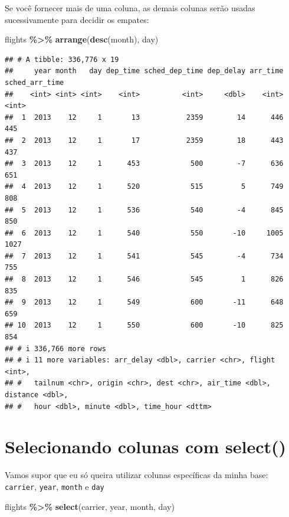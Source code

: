 \documentclass[
]{book}
\newenvironment{Shaded}{\begin{snugshade}}{\end{snugshade}}
\newcommand{\FunctionTok}[1]{\textcolor[rgb]{0.13,0.29,0.53}{\textbf{#1}}}
\newcommand{\NormalTok}[1]{#1}
\newcommand{\SpecialCharTok}[1]{\textcolor[rgb]{0.81,0.36,0.00}{\textbf{#1}}}
\begin{document}
Se você fornecer mais de uma coluna, as demais colunas serão usadas sucessivamente para decidir os empates:

\begin{Shaded}
\begin{Highlighting}[]
\NormalTok{flights }\SpecialCharTok{\%\textgreater{}\%} \FunctionTok{arrange}\NormalTok{(}\FunctionTok{desc}\NormalTok{(month), day)}
\end{Highlighting}
\end{Shaded}

\begin{verbatim}
## # A tibble: 336,776 x 19
##     year month   day dep_time sched_dep_time dep_delay arr_time sched_arr_time
##    <int> <int> <int>    <int>          <int>     <dbl>    <int>          <int>
##  1  2013    12     1       13           2359        14      446            445
##  2  2013    12     1       17           2359        18      443            437
##  3  2013    12     1      453            500        -7      636            651
##  4  2013    12     1      520            515         5      749            808
##  5  2013    12     1      536            540        -4      845            850
##  6  2013    12     1      540            550       -10     1005           1027
##  7  2013    12     1      541            545        -4      734            755
##  8  2013    12     1      546            545         1      826            835
##  9  2013    12     1      549            600       -11      648            659
## 10  2013    12     1      550            600       -10      825            854
## # i 336,766 more rows
## # i 11 more variables: arr_delay <dbl>, carrier <chr>, flight <int>,
## #   tailnum <chr>, origin <chr>, dest <chr>, air_time <dbl>, distance <dbl>,
## #   hour <dbl>, minute <dbl>, time_hour <dttm>
\end{verbatim}

\section{Selecionando colunas com select()}\label{selecionando-colunas-com-select}

Vamos supor que eu só queira utilizar colunas específicas da minha base: \texttt{carrier}, \texttt{year}, \texttt{month} e \texttt{day}

\begin{Shaded}
\begin{Highlighting}[]
\NormalTok{flights }\SpecialCharTok{\%\textgreater{}\%} \FunctionTok{select}\NormalTok{(carrier, year, month, day)}
\end{Highlighting}
\end{Shaded}
\end{document}
